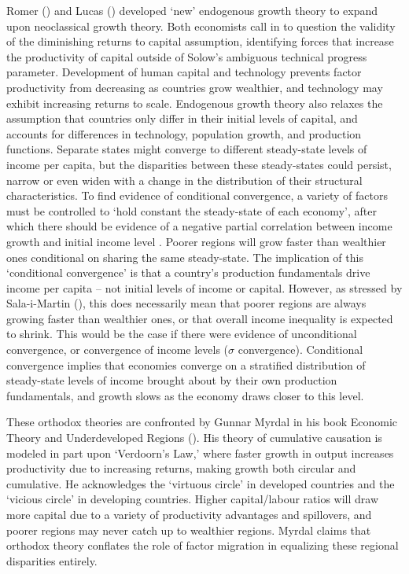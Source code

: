 \documentclass[a4paper, 11pt]{article}
\begin{document}
	 Romer (\citeyear{romer_increasing_1986}) and Lucas (\citeyear{lucas_mechanics_1988}) developed ‘new’ endogenous growth theory to expand upon neoclassical growth theory.  Both economists call in to question the validity of the diminishing returns to capital assumption, identifying forces that increase the productivity of capital outside of Solow’s ambiguous technical progress parameter.  Development of human capital and technology prevents factor productivity from decreasing as countries grow wealthier, and technology may exhibit increasing returns to scale.  Endogenous growth theory also relaxes the assumption that countries only differ in their initial levels of capital, and accounts for differences in technology, population growth, and production functions.  Separate states might converge to different steady-state levels of income per capita, but the disparities between these steady-states could persist, narrow or even widen with a change in the distribution of their structural characteristics.  To find evidence of conditional convergence, a variety of factors must be controlled to ‘hold constant the steady-state of each economy’, after which there should be evidence of a negative partial correlation between income growth and initial income level \citep{sala1996classical}.  Poorer regions will grow faster than wealthier ones conditional on sharing the same steady-state.  The implication of this ‘conditional convergence’ is that a country’s production fundamentals drive income per capita -- not initial levels of income or capital.  However, as stressed by Sala-i-Martin (\citeyear{sala1996classical}), this does necessarily mean that poorer regions are always growing faster than wealthier ones, or that overall income inequality is expected to shrink.  This would be the case if there were evidence of unconditional convergence, or convergence of income levels ($\sigma$ convergence).  Conditional convergence implies that economies converge on a stratified distribution of steady-state levels of income brought about by their own production fundamentals, and growth slows as the economy draws closer to this level.\par
These orthodox theories are confronted by Gunnar Myrdal in his book Economic Theory and Underdeveloped Regions (\citeyear{myrdal_economic_1957}).  His theory of cumulative causation is modeled in part upon ‘Verdoorn’s Law,’ where faster growth in output increases productivity due to increasing returns, making growth both circular and cumulative.  He acknowledges the ‘virtuous circle’ in developed countries and the ‘vicious circle’ in developing countries.  Higher capital/labour ratios will draw more capital due to a variety of productivity advantages and spillovers, and poorer regions may never catch up to wealthier regions.  Myrdal claims that orthodox theory conflates the role of factor migration in equalizing these regional disparities entirely.  \par
\end{document}
